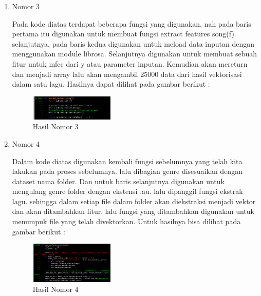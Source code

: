 \begin{enumerate}
\item Nomor 3
\hfill\break
	
Pada kode diatas terdapat beberapa fungsi yang digunakan, nah pada baris pertama itu digunakan untuk membuat fungsi extract features song(f). selanjutnya, pada baris kedua digunakan untuk meload data inputan dengan menggunakan module librosa. Selanjutnya digunakan untuk membuat sebuah fitur untuk mfcc dari y atau parameter inputan. Kemudian akan mereturn dan menjadi  array lalu akan mengambil 25000 data dari hasil vektorisasi dalam satu lagu. Hasilnya dapat dilihat pada gambar berikut :
\hfill\break
	\begin{figure}[H]
		\includegraphics[width=4cm]{figures/1174054/6/22.png}
		\centering
		\caption{Hasil Nomor 3}
	\end{figure}
	
\item Nomor 4
\hfill\break
	
Dalam kode diatas digunakan kembali fungsi sebelumnya yang telah kita lakukan pada proses sebelumnya. lalu dibagian genre disesuaikan dengan dataset nama folder. Dan untuk baris selanjutnya digunakan untuk mengulang genre folder dengan ekstensi .au. lalu dipanggil fungsi ekstrak lagu. sehingga dalam setiap file dalam folder akan diekstraksi menjadi vektor dan akan ditambahkan fitur. lalu fungsi yang ditambahkan digunakan untuk menumpuk file yang telah divektorkan. Untuk hasilnya bisa dilihat pada gambar berikut :
\hfill\break
	\begin{figure}[H]
		\includegraphics[width=4cm]{figures/1174054/6/23.png}
		\centering
		\caption{Hasil Nomor 4}
	\end{figure}	


\end{enumerate}
